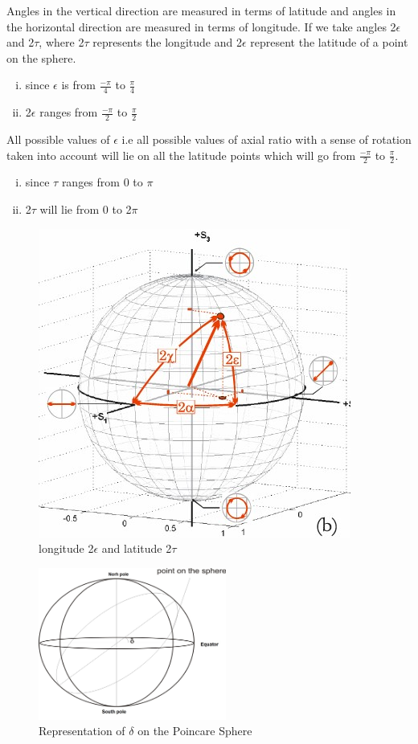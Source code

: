 Angles in the vertical direction are measured in terms of latitude and angles in the horizontal direction are measured in terms of longitude. If we take angles 2$\epsilon$ and 2$\tau$, where 2$\tau$ represents the longitude and 2$\epsilon$ represent the latitude of a point on the sphere.
\begin{enumerate}[(i)]
\item	since $\epsilon$ is from $\frac{-\pi}{4}$ to $\frac{\pi}{4}$
\item 	2$\epsilon$ ranges from $\frac{-\pi}{2}$ to $\frac{\pi}{2}$
\end{enumerate}
All possible values of $\epsilon$ i.e all possible values of axial ratio with a sense of rotation taken into account will lie on all the latitude points which will go from $\frac{-\pi}{2}$ to $\frac{\pi}{2}$. 
\begin{enumerate}[(i)]
\item 	since $\tau$ ranges from 0 to $\pi$
\item 	2$\tau$ will lie from 0 to 2$\pi$
\end{enumerate}
\begin{figure}[h]
\centering
\includegraphics[width=0.7\linewidth]{./graphics/sphere}
\caption{longitude 2$\epsilon$ and latitude 2$\tau$}
\end{figure}
\begin{figure}[h]
\centering
\includegraphics[height=5cm]{./graphics/SPHERE001}
\caption{Representation of $\delta$ on the Poincare Sphere}
\label{fig:sphere001}
\end{figure}

